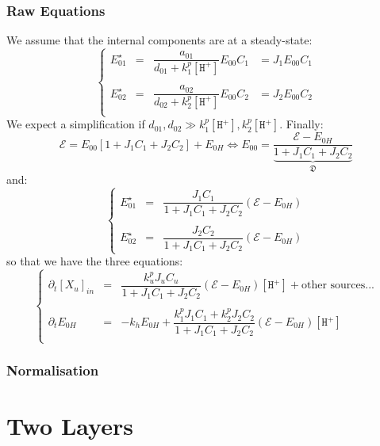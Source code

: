 \documentclass[aps,onecolumn,12pt]{revtex4}
\newcommand{\mychem}[1]{\mathtt{#1}}
\newcommand{\myconc}[1]{\left[#1\right]}
\newcommand{\spproton}{\mychem{H^+}}
\newcommand{\proton}{\myconc{\spproton}}
\begin{document}
\subsubsection{Raw Equations}
We assume that the internal components are at a steady-state:
\begin{equation}
\left\lbrace
\begin{array}{rcll}
	E_{01}^\star & = & \dfrac{a_{01}}{d_{01}+k^p_1 \proton } E_{00} C_1 & = J_1 E_{00} C_1\\
	\\
	E_{02}^\star & = & \dfrac{a_{02}}{d_{02}+k^p_2 \proton } E_{00} C_2 & = J_2 E_{00} C_2\\
\end{array}
\right.
\end{equation}
We expect a simplification if $d_{01},d_{02} \gg k^p_1 \proton, k^p_2 \proton$.
Finally:
\begin{equation}
\mathcal{E} = E_{00}\left[1+J_1C_1+J_2C_2\right] + E_{0H} \Leftrightarrow E_{00} = \dfrac{\mathcal{E}-E_{0H}}{\underbrace{1+J_1C_1+J_2C_2}_{\mathfrak{D}}}
\end{equation}
and:
\begin{equation}
\left\lbrace
\begin{array}{rcl}
	E_{01}^\star & = & \dfrac{J_1C_1}{1+J_1C_1+J_2C_2} \left(\mathcal{E}-E_{0H}\right)\\
	\\
	E_{02}^\star & = & \dfrac{J_2C_2}{1+J_1C_1+J_2C_2} \left(\mathcal{E}-E_{0H}\right)
\end{array}
\right.
\end{equation}
so that we have the three equations:
\begin{equation}
\left\lbrace
\begin{array}{rcl}
	\partial_t \myconc{X_u}_{in} & = & \dfrac{k^p_u J_uC_u}{1+J_1C_1+J_2C_2} \left(\mathcal{E}-E_{0H}\right) \proton + \text{other sources...} \\
	\\
	\partial_t E_{0H} & = & -k_h E_{0H} + \dfrac{k^p_1 J_1C_1 + k^p_2 J_2 C_2 }{1+J_1C_1+J_2C_2} \left(\mathcal{E}-E_{0H}\right) \proton \\
\end{array}
\right.
\end{equation}
\subsubsection{Normalisation}


\section{Two Layers}
\end{document}
